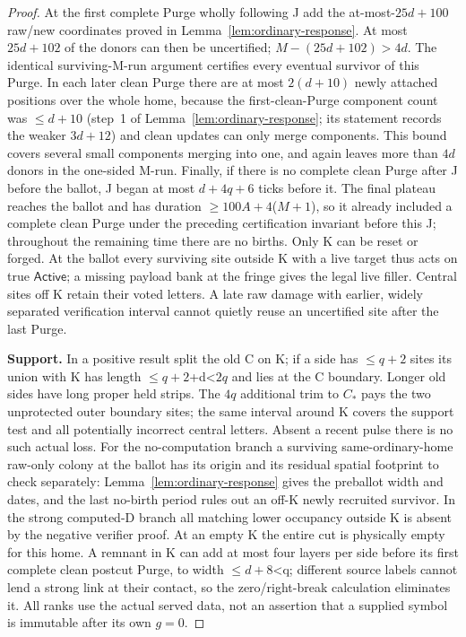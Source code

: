\begin{proof}
At the first complete Purge wholly following J add the at-most-\(25d+100\) raw/new coordinates proved in Lemma~\ref{lem:ordinary-response}. At most \(25d+102\) of the donors can then be uncertified; \(M- (25d+102)>4d\). The identical surviving-M-run argument certifies every eventual survivor of this Purge. In each later clean Purge there are at most \(2(d+10)\) newly attached positions over the whole home, because the first-clean-Purge component count was \(\le\)\(d+10\) (step~1 of Lemma~\ref{lem:ordinary-response}; its statement records the weaker \(3d+12\)) and clean updates can only merge components. This bound covers several small components merging into one, and again leaves more than \(4d\) donors in the one-sided M-run. Finally, if there is no complete clean Purge after J before the ballot, J began at most \(d+4q+6\) ticks before it. The final plateau reaches the ballot and has duration \(\ge\)\(100A+4\)(\(M+1\)), so it already included a complete clean Purge under the preceding certification invariant before this J; throughout the remaining time there are no births. Only K can be reset or forged. At the ballot every surviving site outside K with a live target thus acts on true \(\mathsf{Active}\); a missing payload bank at the fringe gives the legal live filler. Central sites off K retain their voted letters. A late raw damage with earlier, widely separated verification interval cannot quietly reuse an uncertified site after the last Purge.

\textbf{Support.} In a positive result split the old C on K; if a side has \(\le\)\(q+2\) sites its union with K has length \(\le\)\(q+2\)+d\textless{}\(2q\) and lies at the C boundary. Longer old sides have long proper held strips. The \(4q\) additional trim to \(C_*\) pays the two unprotected outer boundary sites; the same interval around K covers the support test and all potentially incorrect central letters. Absent a recent pulse there is no such actual loss. For the no-computation branch a surviving same-ordinary-home raw-only colony at the ballot has its origin and its residual spatial footprint to check separately: Lemma~\ref{lem:ordinary-response} gives the preballot width and dates, and the last no-birth period rules out an off-K newly recruited survivor. In the strong computed-D branch all matching lower occupancy outside K is absent by the negative verifier proof. At an empty K the entire cut is physically empty for this home. A remnant in K can add at most four layers per side before its first complete clean postcut Purge, to width \(\le\)\(d+8\)\textless{}q; different source labels cannot lend a strong link at their contact, so the zero/right-break calculation eliminates it. All ranks use the actual served data, not an assertion that a supplied symbol is immutable after its own \(g=0\).


\end{proof}
